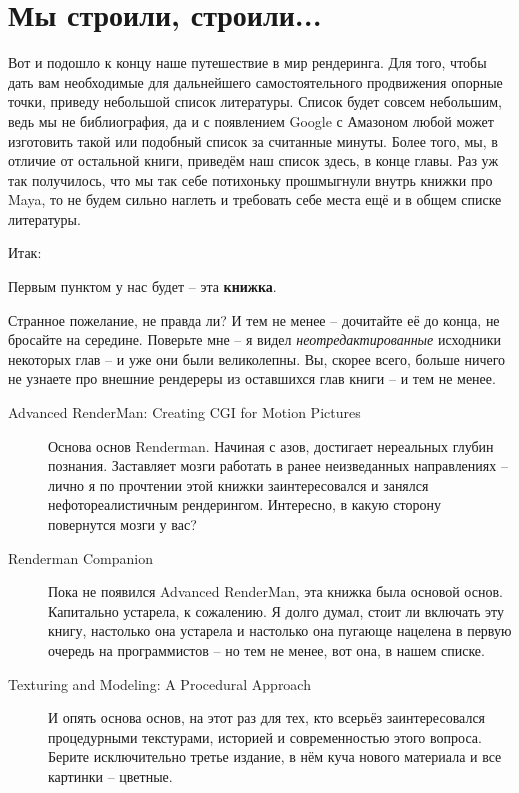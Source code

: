 \chapter*{Мы строили, строили...}

Вот и подошло к концу наше путешествие в мир рендеринга. Для того, чтобы дать вам необходимые для дальнейшего самостоятельного
продвижения опорные точки, приведу небольшой список литературы. Список будет совсем небольшим, ведь мы не библиография, да и с появлением
Google с Амазоном любой может изготовить такой или подобный список за считанные минуты. Более того, мы, в отличие от остальной книги,
приведём наш список здесь, в конце главы. Раз уж так получилось, что мы так себе потихоньку прошмыгнули внутрь книжки про Maya, то не
будем сильно наглеть и требовать себе места ещё и в общем списке литературы.
  
 Итак:
  
     Первым пунктом у нас будет – эта {\bf книжка}.

      Странное пожелание, не правда ли? И тем не менее – дочитайте её до
      конца, не бросайте на середине. Поверьте мне – я видел {\it неотредактированные} исходники
      некоторых глав – и уже они были великолепны. Вы, скорее всего,
      больше ничего не узнаете про внешние рендереры из оставшихся глав
      книги – и тем не менее.

	\begin{description}
	\item [Advanced RenderMan: Creating CGI for Motion Pictures]   Основа основ
      Renderman. Начиная с азов, достигает нереальных глубин познания.
      Заставляет мозги работать в ранее неизведанных направлениях – лично
      я по прочтении этой книжки заинтересовался и занялся
      нефотореалистичным рендерингом. Интересно, в какую сторону
      повернутся мозги у вас?

	\item [Renderman Companion] Пока не появился Advanced
      RenderMan, эта книжка была основой основ. Капитально устарела,
      к сожалению. Я долго думал, стоит ли включать эту книгу, настолько
      она устарела и настолько она пугающе нацелена в первую очередь на
      программистов – но тем не менее, вот она, в нашем
      списке.

	\item [Texturing and Modeling: A Procedural Approach]    И опять основа основ, на
      этот раз для тех, кто всерьёз заинтересовался процедурными
      текстурами, историей и современностью этого вопроса. Берите
      исключительно третье издание, в нём куча нового материала и все
      картинки – цветные.

	\end{description}

